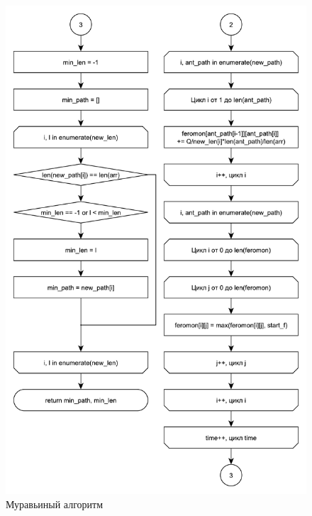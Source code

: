\documentclass[main.tex]{subfiles}
\begin{document}
	\begin{figure}[H]
		\centering
		\includegraphics[scale=0.5]{src/img/2.1}
		\caption{Муравьиный алгоритм}
		\label{fig:2.1}
	\end{figure}
\end{document}
